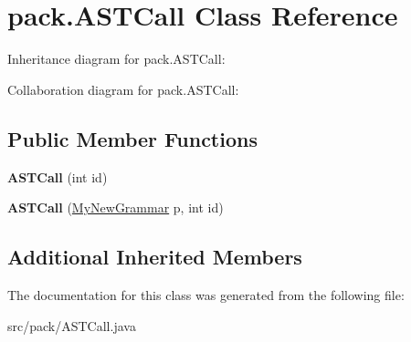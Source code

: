 \hypertarget{classpack_1_1_a_s_t_call}{}\section{pack.\+A\+S\+T\+Call Class Reference}
\label{classpack_1_1_a_s_t_call}


Inheritance diagram for pack.\+A\+S\+T\+Call\+:


Collaboration diagram for pack.\+A\+S\+T\+Call\+:
\subsection*{Public Member Functions}
\begin{DoxyCompactItemize}
\item 
{\bfseries A\+S\+T\+Call} (int id)\hypertarget{classpack_1_1_a_s_t_call_ad1d363ad4e380fd022b65951045d754d}{}\label{classpack_1_1_a_s_t_call_ad1d363ad4e380fd022b65951045d754d}

\item 
{\bfseries A\+S\+T\+Call} (\hyperlink{classpack_1_1_my_new_grammar}{My\+New\+Grammar} p, int id)\hypertarget{classpack_1_1_a_s_t_call_af933311181ff14c422b0853ee35830a8}{}\label{classpack_1_1_a_s_t_call_af933311181ff14c422b0853ee35830a8}

\end{DoxyCompactItemize}
\subsection*{Additional Inherited Members}


The documentation for this class was generated from the following file\+:\begin{DoxyCompactItemize}
\item 
src/pack/A\+S\+T\+Call.\+java\end{DoxyCompactItemize}
